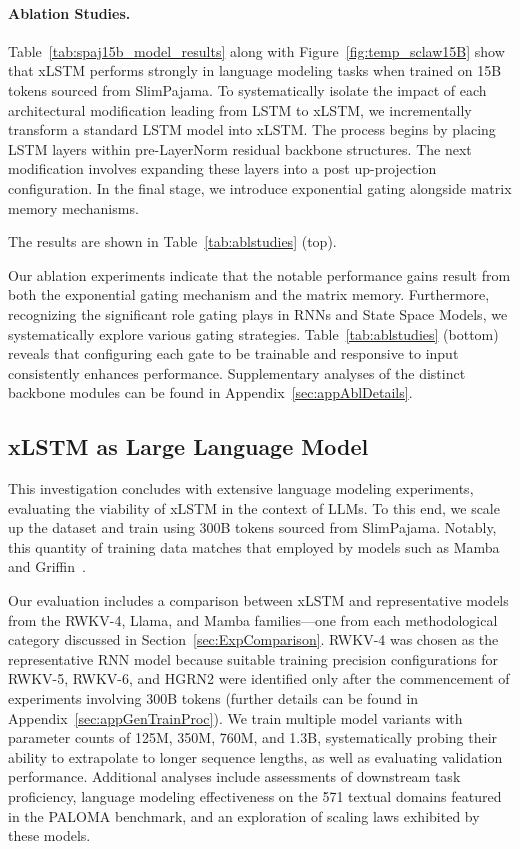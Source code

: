 \paragraph{Ablation Studies.}
Table~\ref{tab:spaj15b_model_results} along with Figure~\ref{fig:temp_sclaw15B} show that xLSTM performs strongly in language modeling tasks when trained on 15B tokens sourced from SlimPajama. To systematically isolate the impact of each architectural modification leading from LSTM to xLSTM, we incrementally transform a standard LSTM model into xLSTM. The process begins by placing LSTM layers within pre-LayerNorm residual backbone structures. The next modification involves expanding these layers into a post up-projection configuration. In the final stage, we introduce exponential gating alongside matrix memory mechanisms.

The results are shown in Table~\ref{tab:ablstudies} (top). 

Our ablation experiments indicate that the notable performance gains result from both the exponential gating mechanism and the matrix memory. Furthermore, recognizing the significant role gating plays in RNNs and State Space Models, we systematically explore various gating strategies. Table~\ref{tab:ablstudies} (bottom) reveals that configuring each gate to be trainable and responsive to input consistently enhances performance. Supplementary analyses of the distinct backbone modules can be found in Appendix~\ref{sec:appAblDetails}.

\subsection{xLSTM as Large Language Model}
\label{sec:ExpLanguage}

This investigation concludes with extensive language modeling experiments, evaluating the viability of xLSTM in the context of LLMs. To this end, we scale up the dataset and train using 300B tokens sourced from SlimPajama. Notably, this quantity of training data matches that employed by models such as Mamba~\citep{Gu:24arxiv} and Griffin~\citep{De:24arxiv}.

Our evaluation includes a comparison between xLSTM and representative models from the RWKV-4, Llama, and Mamba families—one from each methodological category discussed in Section~\ref{sec:ExpComparison}. RWKV-4 was chosen as the representative RNN model because suitable training precision configurations for RWKV-5, RWKV-6, and HGRN2 were identified only after the commencement of experiments involving 300B tokens (further details can be found in Appendix~\ref{sec:appGenTrainProc}). We train multiple model variants with parameter counts of 125M, 350M, 760M, and 1.3B, systematically probing their ability to extrapolate to longer sequence lengths, as well as evaluating validation performance. Additional analyses include assessments of downstream task proficiency, language modeling effectiveness on the 571 textual domains featured in the PALOMA benchmark, and an exploration of scaling laws exhibited by these models.

